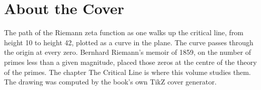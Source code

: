 \backmatter
\cleardoublepage
\chapter*{About the Cover}
\noindent The path of the Riemann zeta function as one walks up the critical line, from height 10 to height 42, plotted as a curve in the plane. The curve passes through the origin at every zero. Bernhard Riemann's memoir of 1859, on the number of primes less than a given magnitude, placed those zeros at the centre of the theory of the primes. The chapter The Critical Line is where this volume studies them. The drawing was computed by the book's own TikZ cover generator.
